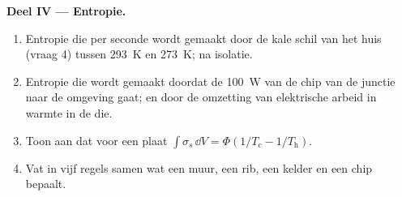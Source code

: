 \begin{problem}
\textbf{Deel IV --- Entropie.}
\begin{enumerate}[resume]
  \item Entropie die per seconde wordt gemaakt door de kale schil van het huis
        (vraag 4) tussen \qty{293}{K} en \qty{273}{K}; na
        isolatie.
  \item Entropie die wordt gemaakt doordat de \qty{100}{W} van de chip van de
        junctie naar de omgeving gaat; en door de omzetting van elektrische
        arbeid in warmte in de die.
  \item Toon aan dat voor een plaat
        $\int\sigma_s\,\dd V = \Phi(1/T_{\text{c}} -
        1/T_{\text{h}})$.
  \item Vat in vijf regels samen wat een muur, een rib, een kelder
        en een chip bepaalt.
\end{enumerate}
\end{problem}
